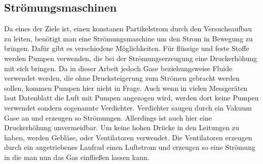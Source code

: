 \subsection{Str\"{o}mungsmaschinen}
Da eines der Ziele ist, einen konstanen Partikelstrom durch den Versuchsaufbau zu leiten, ben\"{o}tigt man eine Str\"{o}mungsmaschine um den Strom in Bewegung zu bringen. Daf\"{u}r gibt es verschiedene M\"{o}glichkeiten. F\"{u}r fl\"{u}ssige und feste Stoffe werden Pumpen verwenden, die bei der Str\"{o}mungserzeugung eine Druckerh\"{o}hung mit sich bringen. Da in dieser Arbeit jedoch Gase beziehungsweise Fluide verwendet werden, die ohne Drucksteigerung zum Str\"{o}men gebracht werden sollen, kommen Pumpen hier nicht in Frage. Auch wenn in vielen Messger\"{a}ten laut Datenblatt die Luft mit Pumpen angezogen wird, werden dort keine Pumpen verwendet sondern sogenannte Verdichter. Verdichter saugen durch ein Vakuum Gase an und erzeugen so Str\"{o}mungen. Allerdings ist auch hier eine Druckerh\"{o}hung unvermeidbar. Um keine hohen Dr\"{u}cke in den Leitungen zu haben, werden Gebl\"{a}se, oder Ventilatoren verwendet. Die Ventilatoren erzeugen durch ein angetriebenes Laufrad einen Luftstrom und erzeugen so eine Str\"{o}mung in die man nun das Gas einflie{\ss}en lassen kann\cite{maschine}.